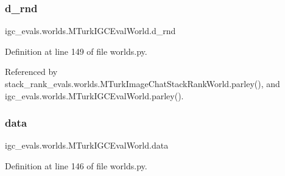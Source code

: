 \subsubsection{\texorpdfstring{d\+\_\+rnd}{d\_rnd}}
{\footnotesize\ttfamily igc\+\_\+evals.\+worlds.\+M\+Turk\+I\+G\+C\+Eval\+World.\+d\+\_\+rnd}



Definition at line 149 of file worlds.\+py.



Referenced by stack\+\_\+rank\+\_\+evals.\+worlds.\+M\+Turk\+Image\+Chat\+Stack\+Rank\+World.\+parley(), and igc\+\_\+evals.\+worlds.\+M\+Turk\+I\+G\+C\+Eval\+World.\+parley().

\mbox{\label{classigc__evals_1_1worlds_1_1MTurkIGCEvalWorld_a074e88bda6e2160158b247b1a6d41a7d}} 
\subsubsection{\texorpdfstring{data}{data}}
{\footnotesize\ttfamily igc\+\_\+evals.\+worlds.\+M\+Turk\+I\+G\+C\+Eval\+World.\+data}



Definition at line 146 of file worlds.\+py.



